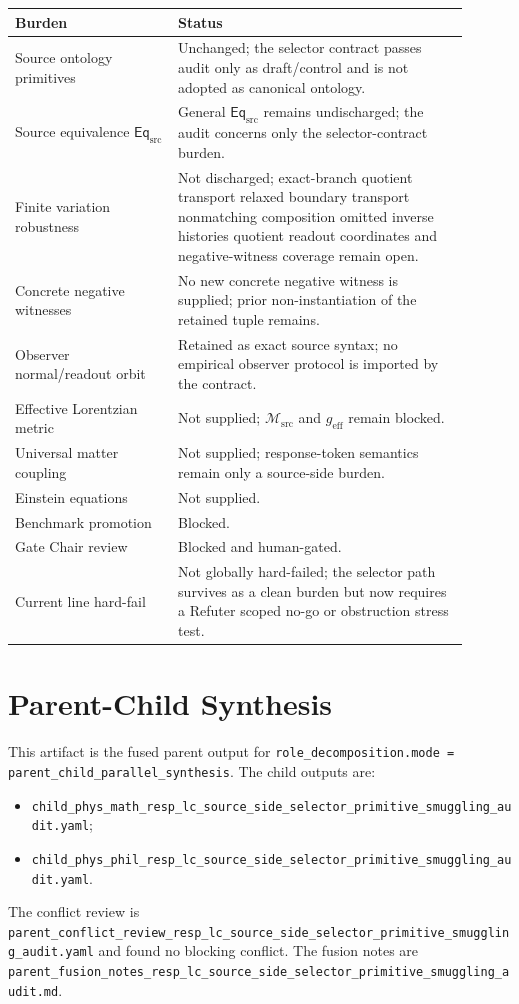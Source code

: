 \documentclass[11pt]{article}
\newcommand{\EqSrc}{\mathsf{Eq}_{\mathrm{src}}}
\newcommand{\Msrc}{\mathcal{M}_{\mathrm{src}}}
\newcommand{\geff}{g_{\mathrm{eff}}}
\begin{document}
\begin{center}
\small
\begin{tabular}{p{0.32\linewidth}p{0.58\linewidth}}
\hline
\textbf{Burden} & \textbf{Status} \\
\hline
Source ontology primitives & Unchanged; the selector contract passes audit only as draft/control and is not adopted as canonical ontology. \\
Source equivalence \(\EqSrc\) & General \(\EqSrc\) remains undischarged; the audit concerns only the selector-contract burden. \\
Finite variation robustness & Not discharged; exact-branch quotient transport relaxed boundary transport nonmatching composition omitted inverse histories quotient readout coordinates and negative-witness coverage remain open. \\
Concrete negative witnesses & No new concrete negative witness is supplied; prior non-instantiation of the retained tuple remains. \\
Observer normal/readout orbit & Retained as exact source syntax; no empirical observer protocol is imported by the contract. \\
Effective Lorentzian metric & Not supplied; \(\Msrc\) and \(\geff\) remain blocked. \\
Universal matter coupling & Not supplied; response-token semantics remain only a source-side burden. \\
Einstein equations & Not supplied. \\
Benchmark promotion & Blocked. \\
Gate Chair review & Blocked and human-gated. \\
Current line hard-fail & Not globally hard-failed; the selector path survives as a clean burden but now requires a Refuter scoped no-go or obstruction stress test. \\
\hline
\end{tabular}
\end{center}

\section{Parent-Child Synthesis}

This artifact is the fused parent output for
\texttt{role\_decomposition.mode = parent\_child\_parallel\_synthesis}.
The child outputs are:
\begin{itemize}
    \item \texttt{child\_phys\_math\_resp\_lc\_source\_side\_selector\_primitive\_smuggling\_audit.yaml};
    \item \texttt{child\_phys\_phil\_resp\_lc\_source\_side\_selector\_primitive\_smuggling\_audit.yaml}.
\end{itemize}
The conflict review is
\texttt{parent\_conflict\_review\_resp\_lc\_source\_side\_selector\_primitive\_smuggling\_audit.yaml}
and found no blocking conflict. The fusion notes are
\texttt{parent\_fusion\_notes\_resp\_lc\_source\_side\_selector\_primitive\_smuggling\_audit.md}.
\end{document}
